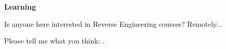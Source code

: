 \vspace*{\fill}

\Large \textbf{Learning}

\bigskip
\bigskip
\bigskip

Is anyone here interested in Reverse Engineering courses? Remotely...

Please tell me what you think: \EMAIL.

\normalsize

\bigskip
\bigskip
\bigskip

\vspace*{\fill}
\vfill
